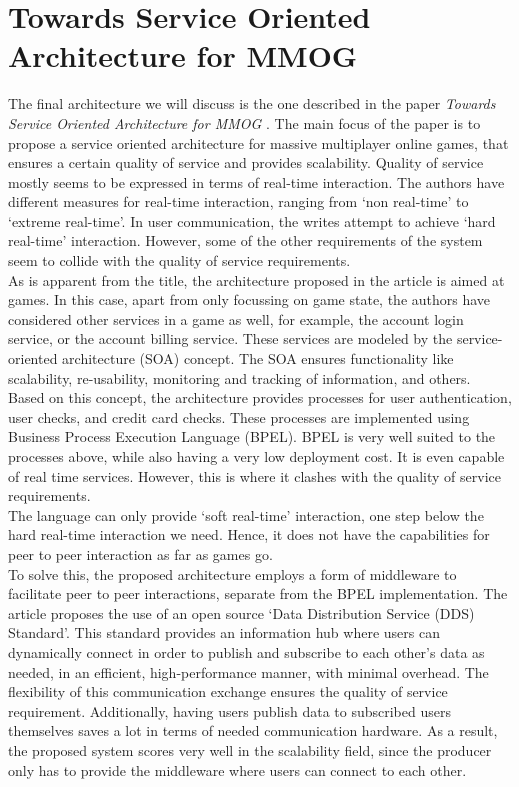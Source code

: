 \section*{Towards Service Oriented Architecture for MMOG}
The final architecture we will discuss is the one described in the paper \emph{Towards Service Oriented Architecture for MMOG} \cite{service}.
The main focus of the paper is to propose a service oriented architecture for massive multiplayer online games, that ensures a certain quality of service and provides scalability.
Quality of service mostly seems to be expressed in terms of real-time interaction.
The authors have different measures for real-time interaction, ranging from `non real-time' to `extreme real-time'.
In user communication, the writes attempt to achieve `hard real-time' interaction.
However, some of the other requirements of the system seem to collide with the quality of service requirements. \\

As is apparent from the title, the architecture proposed in the article is aimed at games.
In this case, apart from only focussing on game state, the authors have considered other services in a game as well, for example, the account login service, or the account billing service.
These services are modeled by the service-oriented architecture (SOA) concept.
The SOA ensures functionality like scalability, re-usability, monitoring and tracking of information, and others. \\
Based on this concept, the architecture provides processes for user authentication, user checks, and credit card checks.
These processes are implemented using Business Process Execution Language (BPEL).
BPEL is very well suited to the processes above, while also having a very low deployment cost.
It is even capable of real time services.
However, this is where it clashes with the quality of service requirements. \\
The language can only provide `soft real-time' interaction, one step below the hard real-time interaction we need.
Hence, it does not have the capabilities for peer to peer interaction as far as games go. \\

To solve this, the proposed architecture employs a form of middleware to facilitate peer to peer interactions, separate from the BPEL implementation.
The article proposes the use of an open source `Data Distribution Service (DDS) Standard'.
This standard provides an information hub where users can dynamically connect in order to publish and subscribe to each other's data as needed, in an efficient, high-performance manner, with minimal overhead.
The flexibility of this communication exchange ensures the quality of service requirement.
Additionally, having users publish data to subscribed users themselves saves a lot in terms of needed communication hardware. 
As a result, the proposed system scores very well in the scalability field, since the producer only has to provide the middleware where users can connect to each other. \\

